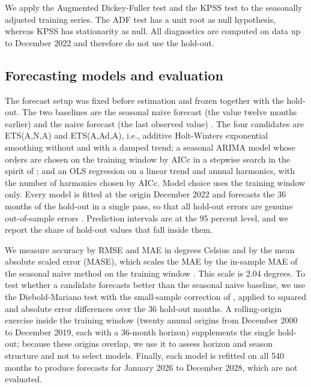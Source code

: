 \documentclass[11pt]{article}
\begin{document}
We apply the Augmented Dickey-Fuller test \citep{dickey1979distribution} and the KPSS test \citep{kwiatkowski1992testing} to the seasonally adjusted training series. The ADF test has a unit root as null hypothesis, whereas KPSS has stationarity as null. All diagnostics are computed on data up to December 2022 and therefore do not use the hold-out.

\subsection{Forecasting models and evaluation}

The forecast setup was fixed before estimation and frozen together with the hold-out. The two baselines are the seasonal naive forecast (the value twelve months earlier) and the naive forecast (the last observed value) \citep{hyndman2021forecasting}. The four candidates are ETS(A,N,A) and ETS(A,Ad,A), i.e., additive Holt-Winters exponential smoothing without and with a damped trend; a seasonal ARIMA model \citep{box2008time} whose orders are chosen on the training window by AICc in a stepwise search in the spirit of \citet{hyndman2008automatic}; and an OLS regression on a linear trend and annual harmonics, with the number of harmonics chosen by AICc. Model choice uses the training window only. Every model is fitted at the origin December 2022 and forecasts the 36 months of the hold-out in a single pass, so that all hold-out errors are genuine out-of-sample errors \citep{tashman2000out}. Prediction intervals are at the 95 percent level, and we report the share of hold-out values that fall inside them.

We measure accuracy by RMSE and MAE in degrees Celsius and by the mean absolute scaled error (MASE), which scales the MAE by the in-sample MAE of the seasonal naive method on the training window \citep{hyndman2006another}. This scale is 2.04 degrees.
To test whether a candidate forecasts better than the seasonal naive baseline, we use the Diebold-Mariano test \citep{diebold1995comparing} with the small-sample correction of \citet{harvey1997testing}, applied to squared and absolute error differences over the 36 hold-out months. A rolling-origin exercise inside the training window (twenty annual origins from December 2000 to December 2019, each with a 36-month horizon) supplements the single hold-out; because these origins overlap, we use it to assess horizon and season structure and not to select models. Finally, each model is refitted on all 540 months to produce forecasts for January 2026 to December 2028, which are not evaluated.
\end{document}
